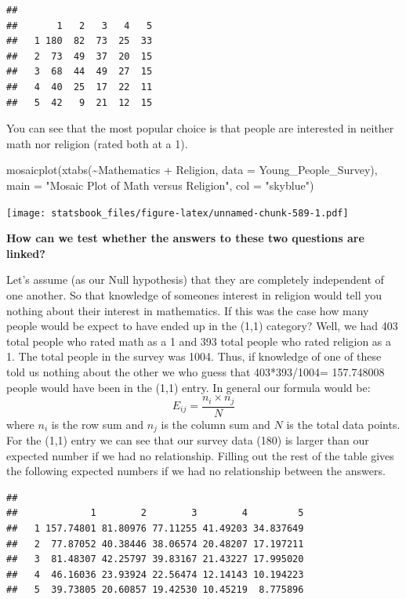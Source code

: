 \documentclass[
]{book}
\newenvironment{Shaded}{\begin{snugshade}}{\end{snugshade}}
\newcommand{\AttributeTok}[1]{\textcolor[rgb]{0.77,0.63,0.00}{#1}}
\newcommand{\FunctionTok}[1]{\textcolor[rgb]{0.00,0.00,0.00}{#1}}
\newcommand{\NormalTok}[1]{#1}
\newcommand{\SpecialCharTok}[1]{\textcolor[rgb]{0.00,0.00,0.00}{#1}}
\newcommand{\StringTok}[1]{\textcolor[rgb]{0.31,0.60,0.02}{#1}}
\theoremstyle{definition}
\theoremstyle{definition}
\theoremstyle{definition}
\theoremstyle{definition}
\theoremstyle{remark}
\begin{document}
\begin{verbatim}
##    
##       1   2   3   4   5
##   1 180  82  73  25  33
##   2  73  49  37  20  15
##   3  68  44  49  27  15
##   4  40  25  17  22  11
##   5  42   9  21  12  15
\end{verbatim}

You can see that the most popular choice is that people are interested in neither math nor religion (rated both at a 1).

\begin{Shaded}
\begin{Highlighting}[]
\FunctionTok{mosaicplot}\NormalTok{(}\FunctionTok{xtabs}\NormalTok{(}\SpecialCharTok{\textasciitilde{}}\NormalTok{Mathematics }\SpecialCharTok{+}\NormalTok{ Religion, }\AttributeTok{data =}\NormalTok{ Young\_People\_Survey), }\AttributeTok{main =} \StringTok{"Mosaic Plot of Math versus Religion"}\NormalTok{,}
    \AttributeTok{col =} \StringTok{"skyblue"}\NormalTok{)}
\end{Highlighting}
\end{Shaded}

\texttt{[image: statsbook\_files/figure-latex/unnamed-chunk-589-1.pdf]}

\textbf{How can we test whether the answers to these two questions are linked?}

Let's assume (as our Null hypothesis) that they are completely independent of one another. So that knowledge of someones interest in religion would tell you nothing about their interest in mathematics. If this was the case how many people would be expect to have ended up in the (1,1) category? Well, we had 403 total people who rated math as a 1 and 393 total people who rated religion as a 1. The total people in the survey was 1004. Thus, if knowledge of one of these told us nothing about the other we who guess that 403*393/1004= 157.748008 people would have been in the (1,1) entry. In general our formula would be:
\[E_{ij}=\frac{n_i \times n_j}{N}\]
where \(n_i\) is the row sum and \(n_j\) is the column sum and \(N\) is the total data points. For the (1,1) entry we can see that our survey data (180) is larger than our expected number if we had no relationship. Filling out the rest of the table gives the following expected numbers if we had no relationship between the answers.

\begin{verbatim}
##    
##             1        2        3        4         5
##   1 157.74801 81.80976 77.11255 41.49203 34.837649
##   2  77.87052 40.38446 38.06574 20.48207 17.197211
##   3  81.48307 42.25797 39.83167 21.43227 17.995020
##   4  46.16036 23.93924 22.56474 12.14143 10.194223
##   5  39.73805 20.60857 19.42530 10.45219  8.775896
\end{verbatim}
\end{document}
